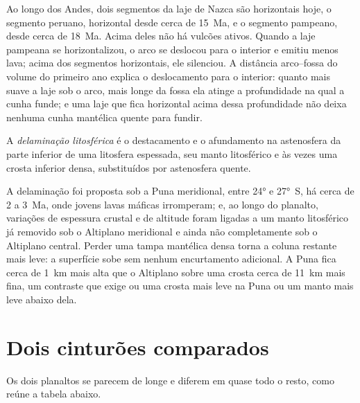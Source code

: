 Ao longo dos Andes, dois segmentos da laje de Nazca são horizontais hoje, o segmento peruano, horizontal
desde cerca de \qty{15}{Ma}, e o segmento pampeano, desde cerca de \qty{18}{Ma}. Acima deles não há
vulcões ativos. Quando a laje pampeana se horizontalizou, o arco se deslocou para o interior e emitiu
menos lava; acima dos segmentos horizontais, ele silenciou. A distância arco--fossa do volume do primeiro ano
explica o deslocamento para o interior: quanto mais suave a laje sob o arco, mais longe da fossa ela
atinge a profundidade na qual a cunha funde; e uma laje que fica horizontal acima dessa profundidade não deixa
nenhuma cunha mantélica quente para fundir.

\begin{definition}\label{def:b2:himalaya-andes:delamination}
A \emph{delaminação litosférica} é o destacamento e o
afundamento na astenosfera da parte inferior de uma litosfera espessada, seu manto
litosférico e às vezes uma crosta inferior densa, substituídos por astenosfera quente.
\end{definition}

A delaminação foi proposta sob a Puna meridional, entre \ang{24} e \ang{27}~S,
há cerca de 2 a \qty{3}{Ma}, onde jovens lavas máficas irromperam; e, ao longo do planalto, variações
de espessura crustal e de altitude foram ligadas a um manto litosférico já removido
sob o Altiplano meridional e ainda não completamente sob o Altiplano central. Perder uma
tampa mantélica densa torna a coluna restante mais leve: a superfície sobe sem nenhum
encurtamento adicional. A Puna fica cerca de \qty{1}{km} mais alta que o Altiplano sobre uma crosta cerca de
\qty{11}{km} mais fina, um contraste que exige ou uma crosta mais leve na Puna ou um manto mais leve
abaixo dela.

\section{Dois cinturões comparados}\label{sec:b2:himalaya-andes:compared}

Os dois planaltos se parecem de longe e diferem em quase todo o resto, como reúne a tabela
abaixo.

